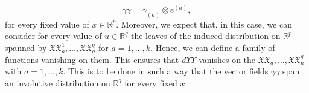 \documentclass{birkjour}
\theoremstyle{definition}
\theoremstyle{remark}
\numberwithin{equation}{section}
\numberwithin{equation}{section}
\numberwithin{thm}{section}
\numberwithin{equation}{section}
\numberwithin{thm}{section}
\begin{document}
\begin{equation}\label{Eq:gammae}
	\gamma\!\!\!\gamma=
	\gamma_{(a)}\otimes e^{(a)},
\end{equation}
for every fixed value of $x\in \mathbb{R}^p$. Moreover, we expect that, in this  case, we can consider  for every value of $u\in\mathbb{R}^q$  the leaves of the induced distribution on $\mathbb{R}^p$ spanned by $\mathfrak{X}\!\!\!\!\mathfrak{X}_a^1,\ldots,\mathfrak{X}\!\!\!\!\mathfrak{X}_a^q$ for $a=1,\ldots,k$. Hence, we can define a family of functions vanishing on them. This ensures that $d\Upsilon\!\!\!\!\!\Upsilon$ vanishes on the $\mathfrak{X}\!\!\!\!\mathfrak{X}^1_a,\ldots,\mathfrak{X}\!\!\!\!\mathfrak{X}^q_a$ with $a=1,\ldots,k$. This is to be done in such a way that the vector fields $\gamma\!\!\!\!\gamma$ span an involutive distribution on $\mathbb{R}^q$ for every fixed $x$. %

\end{document}
